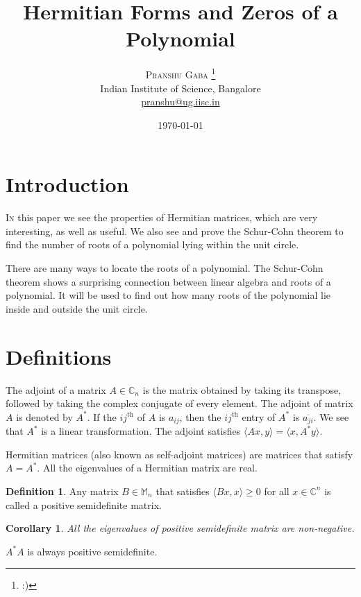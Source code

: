 \documentclass[twofold]{article}
\author{%
\textsc{Pranshu Gaba} \thanks{:)} \\[1ex]
\normalsize Indian Institute of Science, Bangalore \\
\normalsize \href{mailto:pranshu@ug.iisc.in}{pranshu@ug.iisc.in}}
\title{Hermitian Forms and Zeros of a Polynomial}
\date{\today}
\newcommand*\conj[1]{\overline{#1}}
\newcommand*\adj[1]{#1^*}
\theoremstyle{plain}
\newtheorem*{corollary}{Corollary}
\theoremstyle{definition}
\newtheorem*{definition}{Definition}
\begin{document}
\maketitle

\section{Introduction}

\lettrine[nindent=0em,lines=2]{I}n this paper we see the properties of Hermitian matrices, which are very interesting, as well as useful. We also see and prove the Schur-Cohn theorem to find the number of roots of a polynomial lying within the unit circle. 

There are many ways to locate the roots of a polynomial. The Schur-Cohn theorem shows a surprising connection between linear algebra and roots of a polynomial. It will be used to find out how many roots of the polynomial lie inside and outside the unit circle.


\section{Definitions}

The adjoint of a matrix \(A \in \mathbb{C}_n\) is the matrix obtained by taking its transpose, followed by taking the complex conjugate of every element. The adjoint of matrix \(A\) is denoted by \(\adj{A}\). If the \(ij^{\text{th}} \) of \(A\) is \(a_{ij}\), then the \(ij^{\text{th}}\) entry of \(\adj{A}\) is \(\conj{a_{ji}}\). We see that \(\adj{A}\) is a linear transformation. The adjoint satisfies \(\langle Ax, y \rangle = \langle x, \adj{A}y \rangle\). 

Hermitian matrices (also known as self-adjoint matrices) are matrices that satisfy \(A = \adj{A}\). All the eigenvalues of a Hermitian matrix are real. 

\begin{definition} Any matrix \(B \in \mathbb{M}_n\) that satisfies \(\langle Bx, x\rangle \ge 0\) for all \(x \in \mathbb{C}^n\) is called a positive semidefinite matrix. \end{definition}

\begin{corollary}All the eigenvalues of positive semidefinite matrix are non-negative. \end{corollary}




\(\adj{A} A\) is always positive semidefinite. 
\end{document}

